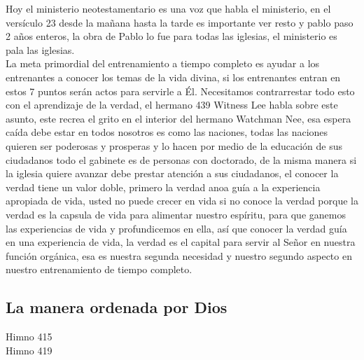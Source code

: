 \documentclass[12pt]{article}
\begin{document}
Hoy el ministerio neotestamentario es una voz que habla el ministerio, en el versículo 23 desde la mañana hasta la tarde es importante ver resto y pablo paso 2 años enteros, la obra de Pablo lo fue para todas las iglesias, el ministerio es pala las iglesias.\\

La meta primordial del entrenamiento a tiempo completo es ayudar a los entrenantes a conocer los temas de la vida divina, si los entrenantes entran en estos 7 puntos serán actos para servirle a Él. Necesitamos contrarrestar  todo esto con el aprendizaje de la verdad, el hermano 439 Witness Lee habla sobre este asunto, este recrea el grito en el interior del hermano Watchman Nee, esa espera caída debe estar en todos nosotros es como las naciones, todas las naciones quieren ser poderosas y prosperas y lo hacen por medio de la educación de sus ciudadanos  todo el gabinete es de personas con doctorado, de la misma manera si la iglesia quiere avanzar debe prestar atención a sus ciudadanos, el conocer la verdad tiene un valor doble, primero la verdad anoa guía a la experiencia apropiada de vida, usted no puede crecer en vida si no conoce la verdad porque la verdad es la capsula de vida para alimentar nuestro espíritu, para que ganemos las experiencias de vida y profundicemos en ella, así que conocer la verdad guía en una experiencia de vida, la verdad es el capital para servir al Señor en nuestra función orgánica, esa es nuestra segunda necesidad y nuestro segundo aspecto en nuestro entrenamiento de tiempo completo.\\

\subsection*{La manera ordenada por Dios}

Himno 415\\

Himno 419\\
\end{document}
